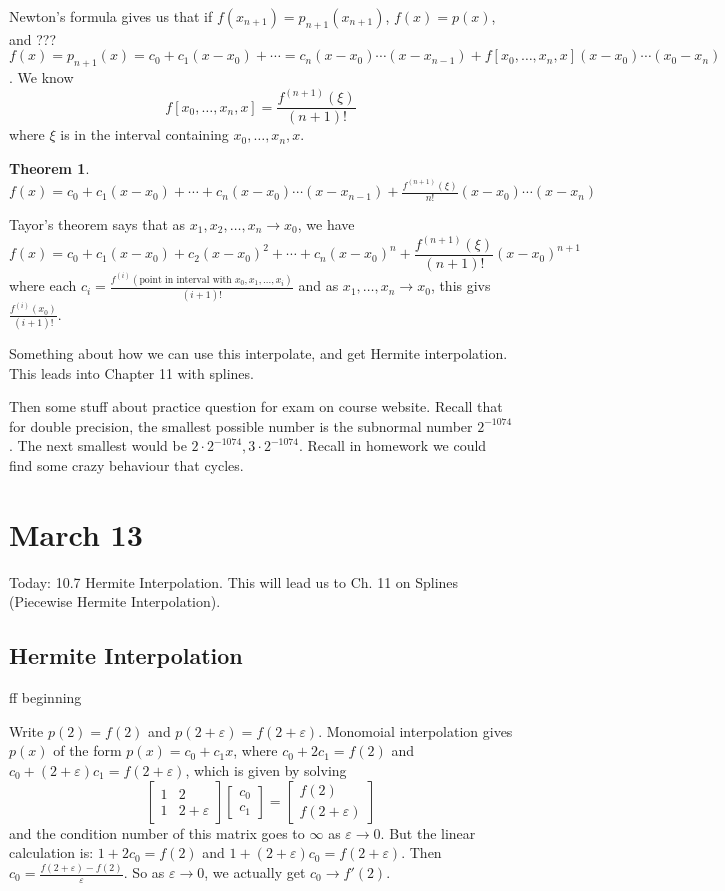 \documentclass{article}
\theoremstyle{plain}
\newtheorem{theorem}{Theorem}
\theoremstyle{remark}
\newcommand{\ep}{{\varepsilon}}
\begin{document}
Newton's formula gives us that if $f(x_{n+1}) = p_{n+1}(x_{n+1})$,
$f(x) = p(x)$,
and ??? $f(x) = p_{n+1}(x) = c_0 + c_1(x-x_0) + \cdots = c_n(x-x_0)\cdots(x-x_{n-1})
+ f[x_0,\dots,x_n,x](x-x_0)\cdots(x_0 - x_n)$.
We know
\[
	f[x_0,\dots,x_n,x] = \frac{f^{(n+1)}(\xi)}{(n+1)!}
\]
where $\xi$ is in the interval containing $x_0,\dots,x_n,x$.
\begin{theorem}
	$f(x) = c_0 + c_1(x-x_0) + \cdots + c_n(x-x_0)\cdots(x-x_{n-1})
	+ \frac{f^{(n+1)}(\xi)}{n!}(x-x_0)\cdots(x-x_n)$
\end{theorem}
Tayor's theorem says that as $x_1,x_2,\dots,x_n \to x_0$,
we have
\[
	f(x) = c_0 + c_1(x-x_0) + c_2(x-x_0)^2
	+ \cdots + c_n(x-x_0)^n + \frac{f^{(n+1)}(\xi)}{(n+1)!}(x-x_0)^{n+1}
\]
where each $c_i = \frac{f^{(i)}(\text{point in interval with }x_0,x_1,\dots,x_i)}{(i+1)!}$
and as $x_1,\dots,x_n \to x_0$, this givs $\frac{f^{(i)}(x_0)}{(i+1)!}$.

Something about how we can use this interpolate, and get Hermite interpolation.
This leads into Chapter 11 with splines.

Then some stuff about practice question for exam on course website.
Recall that for double precision,
the smallest possible number is the subnormal number $2^{-1074}$.
The next smallest would be $2 \cdot 2^{-1074}, 3\cdot2^{-1074}$.
Recall in homework we could find some crazy behaviour that cycles.


\section{March 13}
Today:
10.7 Hermite Interpolation.
This will lead us to Ch. 11 on Splines (Piecewise Hermite Interpolation).

\subsection{Hermite Interpolation}
ff beginning

Write $p(2) = f(2)$ and $p(2+\ep) = f(2 + \ep)$.
Monomoial interpolation gives $p(x)$ of the form $p(x) = c_0 + c_1x$,
where $c_0 + 2c_1 = f(2)$ and $c_0 + (2+\ep)c_1 = f(2+\ep)$,
which is given by solving
\[
	\begin{bmatrix} 1 & 2 \\ 1 & 2 + \ep \end{bmatrix}
	\begin{bmatrix} c_0 \\ c_1 \end{bmatrix} =
	\begin{bmatrix} f(2) \\ f(2+\ep) \end{bmatrix}
\]
and the condition number of this matrix goes to $\infty$ as $\ep \to 0$.
But the linear calculation is:
$1 + 2c_0 = f(2)$ and $1 + (2+\ep)c_0 = f(2+\ep)$.
Then $c_0 = \frac{f(2+\ep)-f(2)}{\ep}$.
So as $\ep \to 0$, we actually get $c_0 \to f'(2)$.
\end{document}
